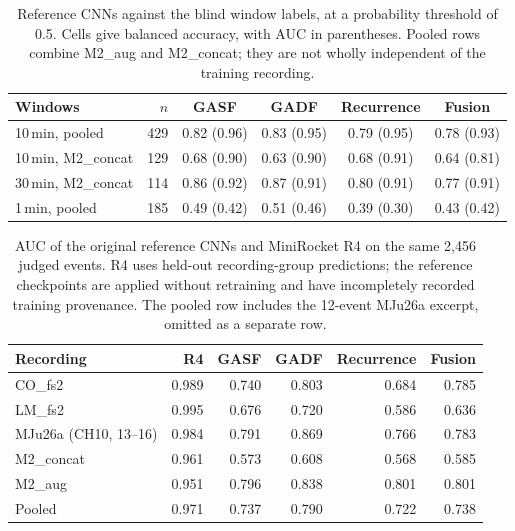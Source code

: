 \begin{table}[htbp]
\centering
\caption[{Reference CNNs against the blind window labels.}]{Reference CNNs against the blind window labels, at a probability threshold of 0.5. Cells give balanced accuracy, with AUC in parentheses. Pooled rows combine M2\_aug and M2\_concat; they are not wholly independent of the training recording.}
\label{tab:cnns}
\small
\begin{tabularx}{\textwidth}{@{}Xrcccc@{}}
\toprule
\textbf{Windows} & \textbf{$n$} & \textbf{GASF} & \textbf{GADF} & \textbf{Recurrence} & \textbf{Fusion}\\
\midrule
10\,min, pooled & 429 & 0.82 (0.96) & 0.83 (0.95) & 0.79 (0.95) & 0.78 (0.93)\\
10\,min, M2\_concat & 129 & 0.68 (0.90) & 0.63 (0.90) & 0.68 (0.91) & 0.64 (0.81)\\
30\,min, M2\_concat & 114 & 0.86 (0.92) & 0.87 (0.91) & 0.80 (0.91) & 0.77 (0.91)\\
1\,min, pooled & 185 & 0.49 (0.42) & 0.51 (0.46) & 0.39 (0.30) & 0.43 (0.42)\\
\bottomrule
\end{tabularx}
\end{table}

\begin{table}[htbp]
\centering
\caption[{Reference CNNs against MiniRocket R4 on the same judged events.}]{AUC of the original reference CNNs and MiniRocket R4 on the same 2,456 judged events. R4 uses held-out recording-group predictions; the reference checkpoints are applied without retraining and have incompletely recorded training provenance. The pooled row includes the 12-event MJu26a excerpt, omitted as a separate row.}
\label{tab:cnnvsr4}
\small
\begin{tabularx}{\textwidth}{@{}Xrrrrr@{}}
\toprule
\textbf{Recording} & \textbf{R4} & \textbf{GASF} & \textbf{GADF} & \textbf{Recurrence} & \textbf{Fusion}\\
\midrule
CO\_fs2 & 0.989 & 0.740 & 0.803 & 0.684 & 0.785\\
LM\_fs2 & 0.995 & 0.676 & 0.720 & 0.586 & 0.636\\
MJu26a (CH10, 13--16) & 0.984 & 0.791 & 0.869 & 0.766 & 0.783\\
M2\_concat & 0.961 & 0.573 & 0.608 & 0.568 & 0.585\\
M2\_aug & 0.951 & 0.796 & 0.838 & 0.801 & 0.801\\
\midrule
Pooled & 0.971 & 0.737 & 0.790 & 0.722 & 0.738\\
\bottomrule
\end{tabularx}
\end{table}

